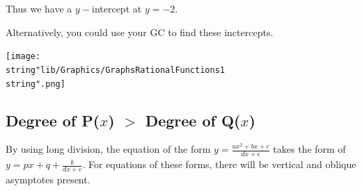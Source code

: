 \documentclass[11pt,a4paper]{book}
\begin{document}
\begin{example}{}
Thus we have a $y-$intercept at $y=-2$.
\begin{flushright}
Alternatively, you could use your GC to find these inctercepts.
\par\end{flushright}

\begin{center}
\texttt{[image: \\string"lib/Graphics/GraphsRationalFunctions1\\string".png]}
\par\end{center}

\end{example}

\newpage

\subsection{Degree of P($x$) $>$ Degree of Q($x$) }

By using long division, the equation of the form ${\displaystyle y=\frac{ax^{2}+bx+c}{dx+e}}$
takes the form of ${\displaystyle y=px+q+\frac{k}{dx+e}}$. For equations of these forms, there will be vertical and oblique asymptotes present.
\end{document}
